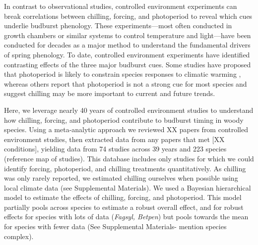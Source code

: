 \documentclass[11pt,letter]{article}
\begin{document}
\par In contrast to observational studies, controlled environment experiments can break correlations between chilling, forcing, and photoperiod to reveal which cues underlie budburst phenology. These experiments---most often conducted in growth chambers or similar systems to control temperature and light---have been conducted for decades as a major method to understand the fundamental drivers of spring phenology. To date, controlled environment experiments have identified contrasting effects of the three major budburst cues. Some studies have proposed that photoperiod is likely to constrain species responses to climatic warming \citep{Basler:2012, Caffarra:2011b,Caffarra:2011a}, whereas others report that photoperiod is not a strong cue for most species \citep{zohner2016,Laube:2014a} and suggest chilling may be more important to current and future trends. 

\par Here, we leverage nearly 40 years of controlled environment studies to understand how chilling, forcing, and photoperiod contribute to budburst timing in woody species. Using a meta-analytic approach we reviewed XX papers from controlled environment studies, then extracted data from any papers that met [XX conditions], yielding data from 74 studies across 39 years and 223 species (reference map of studies).  This database includes only studies for which we could identify forcing, photoperiod, and chilling treatments quantitatively. As chilling was only rarely reported, we estimated chilling ourselves when possible using local climate data (see Supplemental Materials). We used a Bayesian hierarchical model to estimate the effects of chilling, forcing, and photoperiod. This model partially pools across species to estimate a robust overall effect, and for robust effects for species with lots of data (\emph{Fagsyl, Betpen}) but pools towards the mean for species with fewer data (See Supplemental Materials- mention species complex).\\

\end{document}
